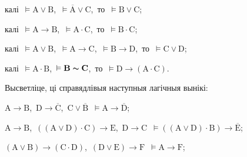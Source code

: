 \begin{problemList}
\begin{belarusianEnumerate}
\item калі\, $\vDash \boldsymbol{\mathrm{A}} \vee \boldsymbol{\mathrm{B}}$,\,
$\vDash \overline{\boldsymbol{\mathrm{A}}} \vee \boldsymbol{\mathrm{C}}$,\,
то\, $\vDash \boldsymbol{\mathrm{B}} \vee \boldsymbol{\mathrm{C}}$;

\item калі\, $\vDash \boldsymbol{\mathrm{A}} \to \boldsymbol{\mathrm{B}}$,\,
$\vDash \boldsymbol{\mathrm{A}} \cdot \boldsymbol{\mathrm{C}}$,\, то\,
$\vDash \boldsymbol{\mathrm{B}} \cdot \boldsymbol{\mathrm{C}}$;

\item калі\, $\vDash \boldsymbol{\mathrm{A}} \vee \boldsymbol{\mathrm{B}}$,\,
$\vDash \boldsymbol{\mathrm{A}} \to \boldsymbol{\mathrm{C}}$,\,
$\vDash \boldsymbol{\mathrm{B}} \to \boldsymbol{\mathrm{D}}$,\, то\,
$\vDash \boldsymbol{\mathrm{C}} \vee \boldsymbol{\mathrm{D}}$;

\item калі\, $\vDash \boldsymbol{\mathrm{A}} \cdot \boldsymbol{\mathrm{B}}$,\,
$\vDash \boldsymbol{\mathrm{B}} \thicksim \boldsymbol{\mathrm{C}}$,\, то\,
$\vDash \boldsymbol{\mathrm{D}} \to (\boldsymbol{\mathrm{A}} \cdot \boldsymbol{\mathrm{C}})$.

\end{belarusianEnumerate}

\smallskip

\item
Высветліце, ці справядлівыя наступныя лагічныя вынікі: \\

\begin{belarusianEnumerate}
\item $\boldsymbol{\mathrm{A}} \to \boldsymbol{\mathrm{B}}$,\,
$\boldsymbol{\mathrm{D}} \to \overline{\boldsymbol{\mathrm{C}}}$,\,
$\boldsymbol{\mathrm{C}} \vee \overline{\boldsymbol{\mathrm{B}}}$\,
$\vDash \boldsymbol{\mathrm{A}} \to \overline{\boldsymbol{\mathrm{D}}}$;

\item $\boldsymbol{\mathrm{A}} \to \boldsymbol{\mathrm{B}}$,\, $((\boldsymbol{\mathrm{A}}
\vee \boldsymbol{\mathrm{D}}) \cdot \boldsymbol{\mathrm{C}}) \to \boldsymbol{\mathrm{E}}$,\,
$\boldsymbol{\mathrm{D}} \to \boldsymbol{\mathrm{C}}$\, $\vDash ((\boldsymbol{\mathrm{A}} \vee \boldsymbol{\mathrm{D}}) \cdot \boldsymbol{\mathrm{B}}) \to \overline{\boldsymbol{\mathrm{E}}}$;

\item $(\boldsymbol{\mathrm{A}} \vee \boldsymbol{\mathrm{B}}) \to (\boldsymbol{\mathrm{C}} \cdot
\boldsymbol{\mathrm{D}})$,\, $(\boldsymbol{\mathrm{D}} \vee \boldsymbol{\mathrm{E}}) \to
\boldsymbol{\mathrm{F}}$\, $\vDash \boldsymbol{\mathrm{A}} \to \boldsymbol{\mathrm{F}}$;


\end{belarusianEnumerate}
\end{problemList}
